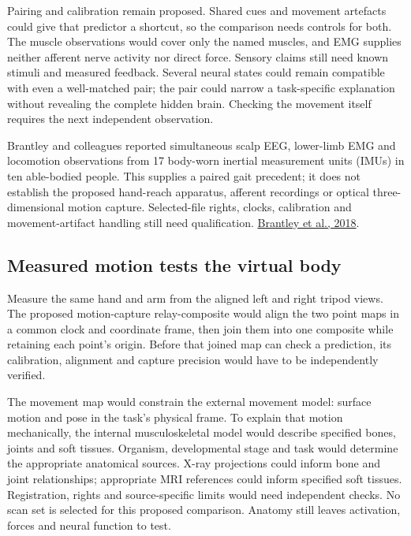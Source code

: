 Pairing and calibration remain proposed. Shared cues and movement artefacts
could give that predictor a shortcut, so the comparison needs controls for
both. The muscle observations would cover only the named muscles, and EMG
supplies neither afferent nerve activity nor direct force. Sensory claims
still need known stimuli and measured feedback. Several neural states could
remain compatible with even a well-matched pair; the pair could narrow a
task-specific explanation without revealing the complete hidden brain.
Checking the movement itself requires the next independent observation.
\par\noindent Brantley and colleagues reported simultaneous scalp EEG, lower-limb EMG and locomotion observations from 17 body-worn inertial measurement units (IMUs) in ten able-bodied people. This supplies a paired gait precedent; it does not establish the proposed hand-reach apparatus, afferent recordings or optical three-dimensional motion capture. Selected-file rights, clocks, calibration and movement-artifact handling still need qualification. \href{https://www.nature.com/articles/sdata2018133}{Brantley et al., 2018}.

\subsection{Measured motion tests the virtual body}
Measure the same hand and arm from the aligned left and right tripod views.
The proposed motion-capture relay-composite would align the two point maps
in a common clock and coordinate frame, then join them into one composite
while retaining each point's origin. Before that joined map can check a
prediction, its calibration, alignment and capture precision would have to
be independently verified.

The movement map would constrain the external movement model: surface motion
and pose in the task's physical frame. To explain that motion mechanically,
the internal musculoskeletal model would describe specified bones, joints
and soft tissues. Organism, developmental stage and task would determine the
appropriate anatomical sources. X-ray projections could inform bone and
joint relationships; appropriate MRI references could inform specified soft
tissues. Registration, rights and source-specific limits would need independent
checks. No scan set is selected for this proposed comparison. Anatomy still
leaves activation, forces and neural function to test.

